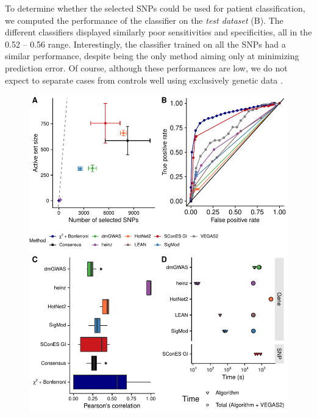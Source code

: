 \documentclass[10pt,letterpaper]{article}
\begin{document}
To determine whether the selected SNPs could be used for patient classification, we computed the performance of the classifier on the \emph{test dataset} (B). The different classifiers displayed similarly poor sensitivities and specificities, all in the 0.52 -- 0.56 range. Interestingly, the classifier trained on all the SNPs had a similar performance, despite being the only method aiming only at minimizing prediction error. Of course, although these performances are low, we do not expect to separate cases from controls well using exclusively genetic data \cite{deloscamposComplexTraitPredictionEra2018}.

\begin{figure}[!ht]
  \centering
  \includegraphics[width=.8\linewidth]{./figures/figure_4.pdf}

\end{figure}
\end{document}
